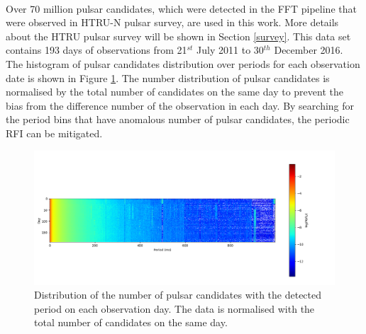 \documentclass[thesis_msc.tex]{subfiles}
\begin{document}
    \paragraph{} Over 70 million pulsar candidates, which were detected in the FFT pipeline that were observed in HTRU-N pulsar survey, are used in this work. More details about the HTRU pulsar survey will be shown in Section \ref{survey}.  This data set contains 193 days of observations from 21$^{st}$ July 2011 to 30$^{th}$ December 2016. The histogram of pulsar candidates distribution over periods for each observation date is shown in Figure \ref{RFI_II}. The number distribution of pulsar candidates is normalised by the total number of candidates on the same day to prevent the bias from the difference number of the observation in each day. By searching for the period bins that have anomalous number of pulsar candidates, the periodic RFI can be mitigated.  

\begin{figure}[h!] 
\centering
\includegraphics[width=1.0\textwidth]{figures/Full_log.png}
\caption{Distribution of the number of pulsar candidates with the detected period on each observation day. The data is normalised with the total number of candidates on the same day.}
\label{RFI_II}
\end{figure}
\end{document}
